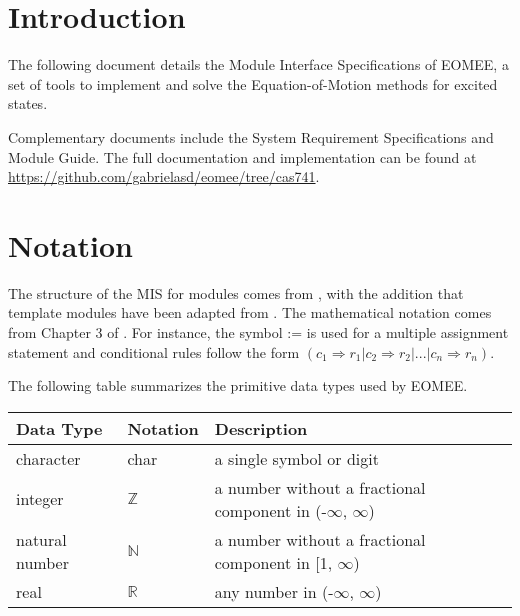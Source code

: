 \documentclass[12pt, titlepage]{article}
\begin{document}
\newpage


\section{Introduction}

The following document details the Module Interface Specifications of EOMEE, a 
set of tools to implement and solve the Equation-of-Motion methods for excited 
states.

Complementary documents include the System Requirement Specifications
and Module Guide.  The full documentation and implementation can be
found at \url{https://github.com/gabrielasd/eomee/tree/cas741}.  

\section{Notation}


The structure of the MIS for modules comes from \citet{HoffmanAndStrooper1995},
with the addition that template modules have been adapted from
\cite{GhezziEtAl2003}.  The mathematical notation comes from Chapter 3 of
\citet{HoffmanAndStrooper1995}.  For instance, the symbol := is used for a
multiple assignment statement and conditional rules follow the form $(c_1
\Rightarrow r_1 | c_2 \Rightarrow r_2 | ... | c_n \Rightarrow r_n )$.

The following table summarizes the primitive data types used by EOMEE. 

\begin{center}
\renewcommand{\arraystretch}{1.2}
\noindent 
\begin{tabular}{l l p{7.5cm}} 
\toprule 
\textbf{Data Type} & \textbf{Notation} & \textbf{Description}\\ 
\midrule
character & char & a single symbol or digit\\
integer & $\mathbb{Z}$ & a number without a fractional component in (-$\infty$, $\infty$) \\
natural number & $\mathbb{N}$ & a number without a fractional component in [1, $\infty$) \\
real & $\mathbb{R}$ & any number in (-$\infty$, $\infty$)\\
\bottomrule
\end{tabular} 
\end{center}
\end{document}
